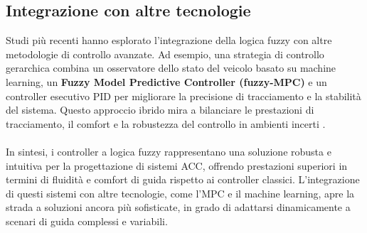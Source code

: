 \subsection*{Integrazione con altre tecnologie}
Studi più recenti hanno esplorato l'integrazione della logica fuzzy con altre metodologie di controllo avanzate. Ad esempio, 
una strategia di controllo gerarchica combina un osservatore dello stato del veicolo basato su machine learning, 
un \textbf{Fuzzy Model Predictive Controller (fuzzy-MPC)} e un controller esecutivo PID per migliorare la precisione di 
tracciamento e la stabilità del sistema. Questo approccio ibrido mira a bilanciare le prestazioni di tracciamento, il 
comfort e la robustezza del controllo in ambienti incerti \cite{guo2023adaptive}.
\\\\
\noindent In sintesi, i controller a logica fuzzy rappresentano una soluzione robusta e intuitiva per la progettazione di sistemi ACC, 
offrendo prestazioni superiori in termini di fluidità e comfort di guida rispetto ai controller classici. L'integrazione di 
questi sistemi con altre tecnologie, come l'MPC e il machine learning, apre la strada a soluzioni ancora più sofisticate, in 
grado di adattarsi dinamicamente a scenari di guida complessi e variabili.